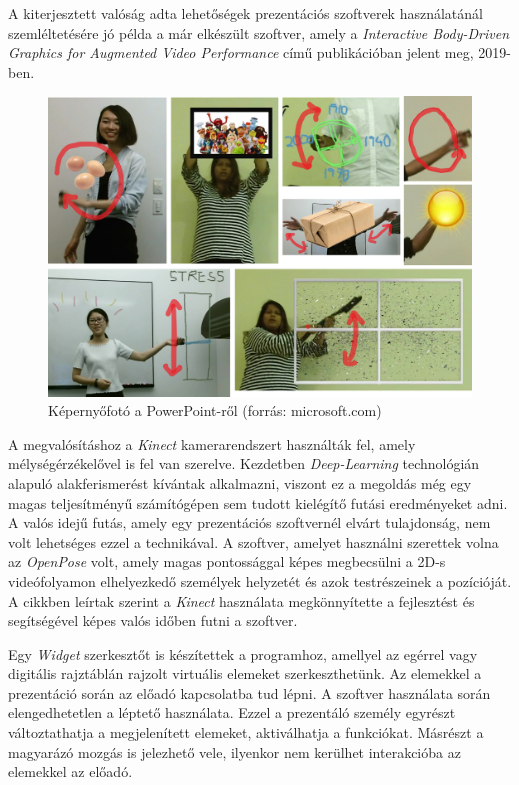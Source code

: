 A kiterjesztett valóság adta lehetőségek prezentációs szoftverek használatánál szemléltetésére jó példa a már elkészült szoftver, amely a \textit{Interactive Body-Driven Graphics for Augmented Video Performance} című publikációban jelent meg, 2019-ben. \cite{saquib2019interactive}

\begin{figure}[h]
\centering
\includegraphics[width=10truecm, height=7.14truecm]{images/IBDGAVP.png}
\caption{Képernyőfotó a PowerPoint-ről (forrás: microsoft.com)}
\label{fig:ibdgavp}
\end{figure}

A megvalósításhoz a \textit{Kinect} kamerarendszert használták fel, amely mélységérzékelővel is fel van szerelve.
Kezdetben \textit{Deep-Learning} technológián alapuló alakferismerést kívántak alkalmazni, viszont ez a megoldás még egy magas teljesítményű számítógépen sem tudott kielégítő futási eredményeket adni. A valós idejű futás, amely egy prezentációs szoftvernél elvárt tulajdonság, nem volt lehetséges ezzel a technikával. A szoftver, amelyet használni szerettek volna az \textit{OpenPose} volt, amely magas pontossággal képes megbecsülni a 2D-s videófolyamon elhelyezkedő személyek helyzetét és azok testrészeinek a pozícióját. \cite{cao2018openpose}
A cikkben leírtak szerint a \textit{Kinect} használata megkönnyítette a fejlesztést és segítségével képes valós időben futni a szoftver.

Egy \textit{Widget} szerkesztőt is készítettek a programhoz, amellyel az egérrel vagy digitális rajztáblán rajzolt virtuális elemeket szerkeszthetünk. Az elemekkel a prezentáció során az előadó kapcsolatba tud lépni. A szoftver használata során elengedhetetlen a léptető használata. Ezzel a prezentáló személy egyrészt változtathatja a megjelenített elemeket, aktiválhatja a funkciókat. Másrészt a magyarázó mozgás is jelezhető vele, ilyenkor nem kerülhet interakcióba az elemekkel az előadó.

